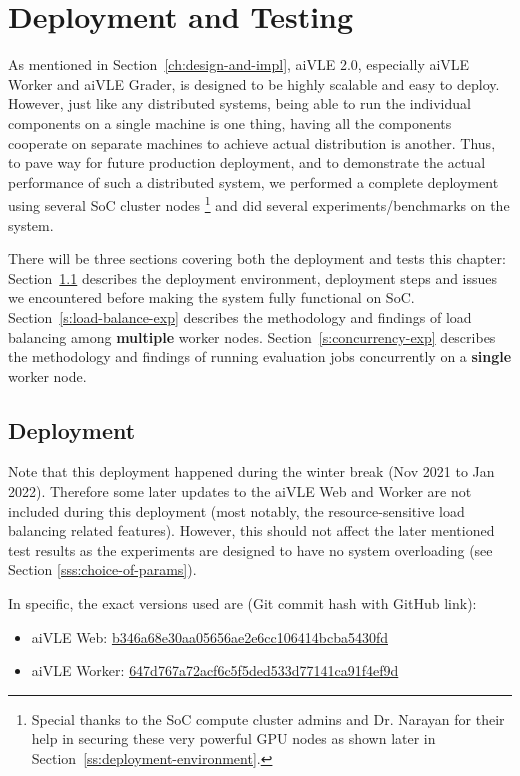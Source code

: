 \chapter{Deployment and Testing}
\label{ch:deployment-and-testing}
As mentioned in Section~\ref{ch:design-and-impl}, aiVLE 2.0, especially aiVLE Worker and aiVLE Grader, is designed to be highly scalable and easy to deploy. However, just like any distributed systems, being able to run the individual components on a single machine is one thing, having all the components cooperate on separate machines to achieve actual distribution is another. Thus, to pave way for future production deployment, and to demonstrate the actual performance of such a distributed system, we performed a complete deployment using several SoC cluster nodes \footnote{Special thanks to the SoC compute cluster admins and Dr. Narayan for their help in securing these very powerful GPU nodes as shown later in Section~\ref{ss:deployment-environment}.} and did several experiments/benchmarks on the system.

There will be three sections covering both the deployment and tests this chapter: Section~\ref{s:deployment} describes the deployment environment, deployment steps and issues we encountered before making the system fully functional on SoC. Section~\ref{s:load-balance-exp} describes the methodology and findings of load balancing among \textbf{multiple} worker nodes. Section~\ref{s:concurrency-exp} describes the methodology and findings of running evaluation jobs concurrently on a \textbf{single} worker node.

\section{Deployment}
\label{s:deployment}
Note that this deployment happened during the winter break (Nov 2021 to Jan 2022). Therefore some later updates to the aiVLE Web and Worker are not included during this deployment (most notably, the resource-sensitive load balancing related features). However, this should not affect the later mentioned test results as the experiments are designed to have no system overloading (see Section \ref{sss:choice-of-params}).

In specific, the exact versions used are (Git commit hash with GitHub link):
\begin{itemize}
    \item aiVLE Web: \href{https://github.com/edu-ai/aivle-web/commit/b346a68e30aa05656ae2e6cc106414bcba5430fd}{b346a68e30aa05656ae2e6cc106414bcba5430fd}
    \item aiVLE Worker: \href{https://github.com/edu-ai/aivle-worker/commit/647d767a72acf6c5f5ded533d77141ca91f4ef9d}{647d767a72acf6c5f5ded533d77141ca91f4ef9d}
\end{itemize}


